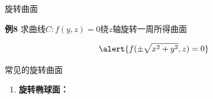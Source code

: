 \begin{frame}{旋转曲面}
	\linespread{1.2}\pause 
	\begin{center}
	\end{center}\pause 
	\vspace{-1em}
	\begin{exampleblock}{{\bf 例8}\hfill}
		求曲线$C:f(y,z)=0$绕$z$轴旋转一周所得曲面
	\end{exampleblock}\pause 
	\bigskip
	$$\alert{f(\pm\sqrt{x^2+y^2},z)=0}$$
\end{frame}

\begin{frame}{常见的旋转曲面}
	\linespread{1.2}\pause 
	\begin{enumerate}
	  \item {\bf 旋转椭球面：}%
	  \begin{center}\pause 
   	  \end{center}
	\end{enumerate}
\end{frame}

